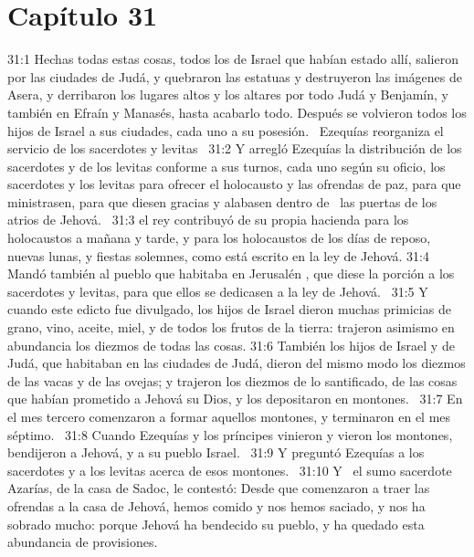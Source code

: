 																														\section*{Capítulo 31}
																															31:1 Hechas todas estas cosas, todos los de Israel que habían estado allí, salieron por las ciudades de Judá, y quebraron las estatuas y destruyeron las imágenes de Asera, y derribaron los lugares altos y los altares por todo Judá y Benjamín, y también en Efraín y Manasés, hasta acabarlo todo. Después se volvieron todos los hijos de Israel a sus ciudades, cada uno a su posesión.  
																															Ezequías reorganiza el servicio de los sacerdotes y levitas  
																															31:2 Y arregló Ezequías la distribución de los sacerdotes y de los levitas conforme a sus turnos, cada uno según su oficio, los sacerdotes y los levitas para ofrecer el holocausto y las ofrendas de paz, para que ministrasen, para que diesen gracias y alabasen dentro de  las puertas de los atrios de Jehová.  
																															31:3 el rey contribuyó de su propia hacienda para los holocaustos a mañana y tarde, y para los holocaustos de los días de reposo, nuevas lunas, y fiestas solemnes, como está escrito en la ley de Jehová. 
																															31:4 Mandó también al pueblo que habitaba en Jerusalén , que diese la porción a los sacerdotes y levitas, para que ellos se dedicasen a la ley de Jehová.  
																															31:5 Y cuando este edicto fue divulgado, los hijos de Israel dieron muchas primicias de grano, vino, aceite, miel, y de todos los frutos de la tierra: trajeron asimismo en abundancia los diezmos de todas las cosas. 
																															31:6 También los hijos de Israel y de Judá, que habitaban en las ciudades de Judá, dieron del mismo modo los diezmos de las vacas y de las ovejas; y trajeron los diezmos de lo santificado, de las cosas que habían prometido a Jehová su Dios, y los depositaron en montones.  
																															31:7 En el mes tercero comenzaron a formar aquellos montones, y terminaron en el mes séptimo.  
																															31:8 Cuando Ezequías y los príncipes vinieron y vieron los montones, bendijeron a Jehová, y a su pueblo Israel.  
																															31:9 Y preguntó Ezequías a los sacerdotes y a los levitas acerca de esos montones.  
																															31:10 Y  el sumo sacerdote Azarías, de la casa de Sadoc, le contestó: Desde que comenzaron a traer las ofrendas a la casa de Jehová, hemos comido y nos hemos saciado, y nos ha sobrado mucho: porque Jehová ha bendecido su pueblo, y ha quedado esta abundancia de provisiones.  
